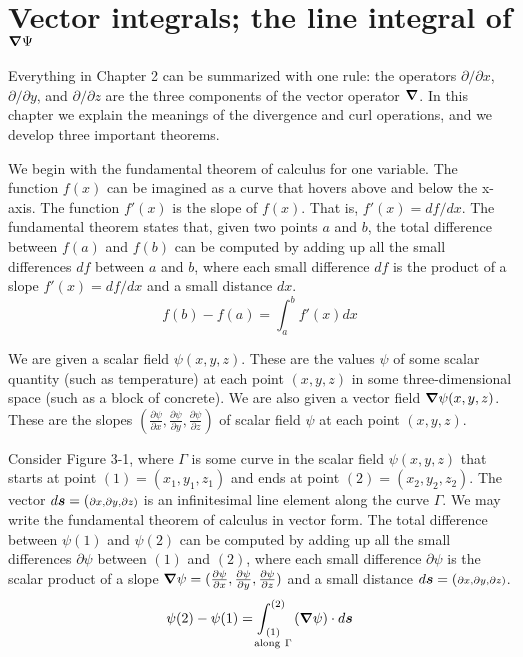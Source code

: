 \section{Vector integrals; the line integral of $\boldsymbol{\nabla}\Psi$}

Everything in Chapter 2 can be summarized with one rule:
the operators $\partial/\partial x$, $\partial/\partial y$, and $\partial/\partial z$
are the three components of the vector operator $\boldsymbol{\nabla}$.
In this chapter we explain the meanings of the divergence and curl operations,
and we develop three important theorems.

We begin with the fundamental theorem of calculus for one variable.
The function $f(x)$ can be imagined as a curve that hovers above and below the x-axis.
The function $f'(x)$ is the slope of $f(x)$.  That is, $f'(x) = df/dx$.
The fundamental theorem states that, given two points $a$ and $b$,  
the total difference between $f(a)$ and $f(b)$ can be computed by 
adding up all the small differences $df$ between $a$ and $b$,
where each small difference $df$ is the product of a slope $f'(x)=df/dx$ and a small distance $dx$.
\begin{equation*}
  f(b) - f(a) = \int _a ^b f'(x) dx
\end{equation*}

We are given a scalar field $\psi(x,y,z)$.
These are the values $\psi$ of some scalar quantity (such as temperature)
at each point $(x,y,z)$ in some three-dimensional space (such as a block of concrete).
We are also given a vector field $\boldsymbol{\nabla}\psi(x,y,z)$.
These are the slopes $(\frac{\partial\psi}{\partial x},
\frac{\partial\psi}{\partial y},\frac{\partial\psi}{\partial z})$
of scalar field $\psi$ at each point $(x,y,z)$.

\newpage
Consider Figure 3-1, where $\Gamma$ is some curve in the scalar field $\psi(x,y,z)$ 
that starts at point $(1)=(x_1,y_1,z_1)$ and ends at point $(2)=(x_2,y_2,z_2)$.
The vector $d\boldsymbol{s}= (\scriptstyle{\partial x,\partial y,\partial z})$
is an infinitesimal line element along the curve $\Gamma$.
We may write the fundamental theorem of calculus in vector form.
The total difference between $\psi(1)$ and $\psi(2)$ can be computed by 
adding up all the small differences $\partial\psi$ between $(1)$ and $(2)$,
where each small difference $\partial\psi$ is the scalar product of 
a slope $\boldsymbol{\nabla}\psi=(\frac{\partial\psi}{\partial x},
\frac{\partial\psi}{\partial y},\frac{\partial\psi}{\partial z})$
and a small distance $d\boldsymbol{s}= (\scriptstyle{\partial x,\partial y,\partial z})$.
\begin{equation}
  \psi(2) - \psi(1) = \int
  _{\hspace{-2ex}\raisebox{-1ex}{\mbox{$\genfrac{}{}{0pt}{1}{(1)}{\mathrm{along\ }\Gamma}$}}}
  ^{(2)} (\grad \psi) \cdot d\bv{s}
\end{equation}

